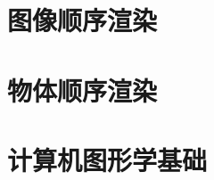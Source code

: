 \documentclass{notebook-neon}
\begin{document}
\tableofcontents
\listoffigures
\listoftables

\mainmatter

\nocite{*}

\part{图像顺序渲染}





\part{物体顺序渲染}





\part{计算机图形学基础}







\appendix

\backmatter


\end{document}
